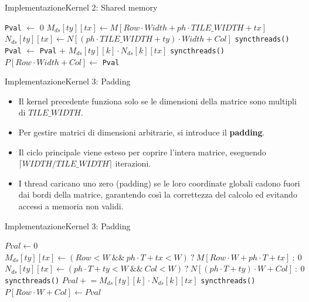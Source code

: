 \documentclass{beamer}
\begin{document}
\begin{frame}{Implementazione}{Kernel 2: Shared memory}
    \begin{algorithm}[H]
        \caption{Kernel 2}
        \begin{algorithmic}[1]
            \State \texttt{Pval} $\gets$ 0
            \State $M_{ds}[ty][tx] \gets M[Row \cdot Width + ph \cdot TILE\_WIDTH + tx]$
            \State $N_{ds}[ty][tx] \gets N[(ph \cdot TILE\_WIDTH + ty) \cdot Width + Col]$
            \State \texttt{syncthreads()}
            \State \texttt{Pval} $\gets$ \texttt{Pval} $+$ $M_{ds}[ty][k] \cdot N_{ds}[k][tx]$
            \EndFor
            \State \texttt{syncthreads()}
            \EndFor
            \State $P[Row \cdot Width + Col] \gets$ \texttt{Pval}
        \end{algorithmic}
    \end{algorithm}
\end{frame}

\begin{frame}{Implementazione}{Kernel 3: Padding}
    \begin{itemize}
        \item Il kernel precedente funziona solo se le dimensioni della matrice sono multipli di $TILE\_WIDTH$.
        \item Per gestire matrici di dimensioni arbitrarie, si introduce il \textbf{padding}.
        \item Il ciclo principale viene esteso per coprire l'intera matrice, eseguendo $\lceil WIDTH/TILE\_WIDTH \rceil$ iterazioni.
        \item I thread caricano uno zero (padding) se le loro coordinate globali cadono fuori dai bordi della matrice, garantendo così la correttezza del calcolo ed evitando accessi a memoria non validi.
    \end{itemize}
\end{frame}

\begin{frame}{Implementazione}{Kernel 3: Padding}
    \begin{algorithm}[H]
        \scriptsize
        \caption{Kernel 3 con padding}
        \begin{algorithmic}[1]
            \State $Pval \gets 0$
            \State $M_{ds}[ty][tx] \gets (Row<W~\&\&~ph\cdot T+tx<W)~?~M[Row\cdot W + ph\cdot T + tx]~:~0$
            \State $N_{ds}[ty][tx] \gets (ph\cdot T+ty<W~\&\&~Col<W)~?~N[(ph\cdot T+ty)\cdot W + Col]~:~0$
            \State \texttt{syncthreads()}
            \State $Pval \mathrel{+}= M_{ds}[ty][k] \cdot N_{ds}[k][tx]$
            \EndFor
            \State \texttt{syncthreads()}
            \EndFor
            \State $P[Row\cdot W + Col] \gets Pval$
            \EndIf
        \end{algorithmic}
    \end{algorithm}
\end{frame}
\end{document}
